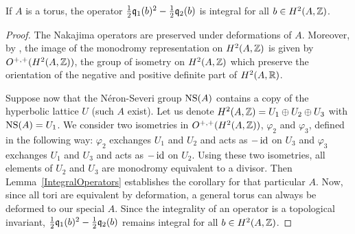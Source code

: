 \begin{corollary} \label{IntegralOperatorsTorus}
If $A$ is a torus, the operator $\frac{1}{2}\mathfrak{q}_1(b)^2 - \frac{1}{2}\mathfrak{q}_2(b)$ is integral for all $b\in H^2(A,\mathbb{Z})$. 
\end{corollary}
\begin{proof}
The Nakajima operators are preserved under deformations of $A$. 
Moreover, by %
\cite{Borcea}, 
the image of the monodromy representation on $H^2(A,\mathbb{Z})$ is given by $O^{+,+}(H^2(A,\mathbb{Z}))$, the group of isometry on $H^2(A,\mathbb{Z})$ which preserve the orientation of the negative and positive definite part of $H^2(A,\mathbb{R})$.


Suppose now that the N\'eron-Severi group $\operatorname{NS}(A)$ contains a copy of the hyperbolic lattice $U$ (such $A$ exist).
Let us denote $H^2(A,\mathbb{Z})=U_1\oplus U_2\oplus U_3$ with $\operatorname{NS}(A)=U_1$.
We consider two isometries in $O^{+,+}(H^2(A,\mathbb{Z}))$, $\varphi_2$ and $\varphi_3$, defined in the following way:
$\varphi_2$ exchanges $U_1$ and $U_2$ and acts as $-\operatorname{id}$ on $U_3$ and $\varphi_3$ exchanges $U_1$ and $U_3$ and acts as $-\operatorname{id}$ on $U_2$.
Using these two isometries, all elements of $U_2$ and $U_3$ are monodromy equivalent to a divisor.
Then Lemma~\ref{IntegralOperators} establishes the corollary for that particular $A$. 
Now, since all tori are equivalent by deformation, a general torus can always be deformed to our special $A$. Since the integrality of an operator is a topological invariant, $\frac{1}{2}\mathfrak{q}_1(b)^2 - \frac{1}{2}\mathfrak{q}_2(b)$ remains integral for all $b\in H^2(A,\mathbb{Z})$.
\end{proof}

